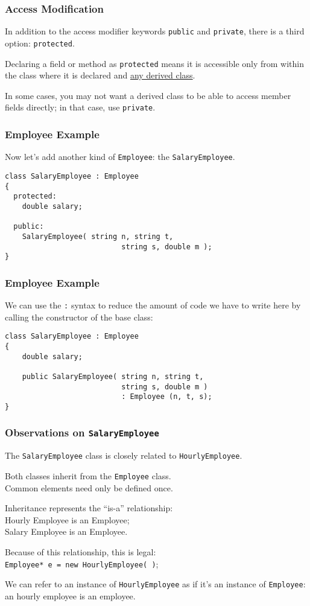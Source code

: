 \begin{frame}
\frametitle{Access Modification}
In addition to the access modifier keywords \texttt{public} and \texttt{private}, there is a third option: \texttt{protected}.

Declaring a field or method as \texttt{protected} means it is accessible only from within the class where it is declared and \underline{any derived class}.

In some cases, you may not want a derived class to be able to access member fields directly; in that case, use \texttt{private}.

\end{frame}

\begin{frame}[fragile]
\frametitle{Employee Example}

Now let's add another kind of \texttt{Employee}: the \texttt{SalaryEmployee}.

\begin{verbatim}
class SalaryEmployee : Employee
{
  protected:
    double salary;

  public:
    SalaryEmployee( string n, string t, 
                           string s, double m );
}
\end{verbatim}

\end{frame}

\begin{frame}[fragile]
\frametitle{Employee Example}

We can use the \texttt{:} syntax to reduce the amount of code we have to write here by calling the constructor of the base class:

\begin{verbatim}
class SalaryEmployee : Employee
{
    double salary;

    public SalaryEmployee( string n, string t, 
                           string s, double m ) 
                           : Employee (n, t, s);
}
\end{verbatim}

\end{frame}


\begin{frame}
\frametitle{Observations on \texttt{SalaryEmployee}}

The \texttt{SalaryEmployee} class is closely related to \texttt{HourlyEmployee}.

Both classes inherit from the \texttt{Employee} class.\\
\quad Common elements need only be defined once.

Inheritance represents the ``is-a'' relationship:\\
\quad Hourly Employee is an Employee;\\
\quad Salary Employee is an Employee.

Because of this relationship, this is legal:\\
\quad \texttt{Employee* e = new HourlyEmployee( )};

We can refer to an instance of \texttt{HourlyEmployee} as if it's an instance of \texttt{Employee}: an hourly employee is an employee.

\end{frame}

